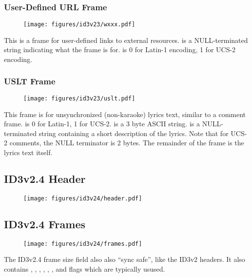 \subsubsection{User-Defined URL Frame}

\begin{figure}[h]
\texttt{[image: figures/id3v23/wxxx.pdf]}
\end{figure}
\par
\noindent
This is a frame for user-defined links to external resources.
 is a NULL-terminated string indicating
what the frame is for.
 is 0 for Latin-1 encoding, 1 for UCS-2 encoding.

\clearpage

\subsubsection{USLT Frame}
\begin{figure}[h]
  \texttt{[image: figures/id3v23/uslt.pdf]}
\end{figure}
\par
\noindent
This frame is for unsynchronized (non-karaoke) lyrics text,
similar to a comment frame.
 is 0 for Latin-1, 1 for UCS-2.
 is a 3 byte ASCII string.
 is a NULL-terminated string
containing a short description of the lyrics.
Note that for UCS-2 comments, the NULL terminator is 2 bytes.
The remainder of the frame is the lyrics text itself.

\clearpage

\subsection{ID3v2.4 Header}
\begin{figure}[h]
\texttt{[image: figures/id3v24/header.pdf]}
\end{figure}

\subsection{ID3v2.4 Frames}
\begin{figure}[h]
  \texttt{[image: figures/id3v24/frames.pdf]}
\end{figure}
\par
\noindent
The ID3v2.4 frame size field also also ``sync safe'', like the ID3v2 headers.
It also contains , , ,
, , , 
and  flags which are typically usused.

